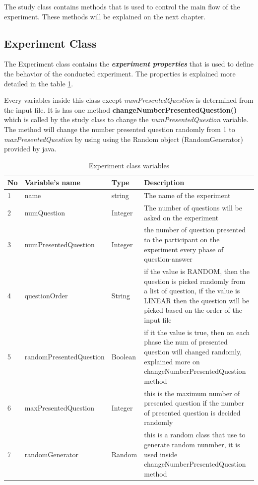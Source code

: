 
The study class contains methods that is used to control the main flow of the experiment.
These methods will be explained on the next chapter.
\subsection{Experiment Class}
The Experiment class contains the \textit{\textbf{experiment properties}} that is used to define the behavior of the conducted experiment. The properties is explained more detailed in the table \ref{tab:ExperimentClassVariable}.

Every variables inside this class except \textit{numPresentedQuestion} is determined from the input file. It is has one method \textbf{changeNumberPresentedQuestion()} which is called by the study class to change the \textit{numPresentedQuestion} variable. The method will change the number presented question randomly from 1 to \textit{maxPresentedQuestion} by using using the Random object (RandomGenerator) provided by java.



\begin{table}[!htb]
  \centering
\begin{longtable}{ |p{0.5cm}|p{5cm}|p{2.3cm}|p{6cm}|  }
 \hline
 No& Variable's name & Type & Description \\
 \hline
 1 & name & string  & The name of the experiment\\
 2 & numQuestion & Integer & The number of questions will be asked on the experiment \\
 3 & numPresentedQuestion & Integer & the number of question presented to the participant on the experiment every phase of question-answer \\
 4 & questionOrder & String & if the value is RANDOM, then the question is picked randomly from a list of question, if the value is LINEAR then the question will be picked based on the order of the input file \\
 5 & randomPresentedQuestion & Boolean & if it the value is true, then on each phase the num of presented question will changed randomly, explained more on changeNumberPresentedQuestion method \\
 6 & maxPresentedQuestion & Integer & this is the maximum number of presented question if the number of presented question is decided randomly\\
 7 & randomGenerator & Random  & this is a random class that use to generate random nunmber, it is used inside changeNumberPresentedQuestion method \\
\hline
\end{longtable} \par
\caption{Experiment class variables}
 \label{tab:ExperimentClassVariable}
\end{table}

